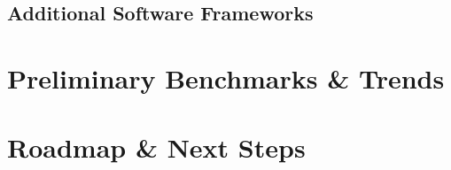 \subsection{Additional Software Frameworks}

\section{Preliminary Benchmarks \& Trends}

\section{Roadmap \& Next Steps}
